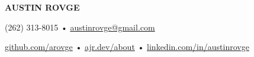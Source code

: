 \centering\textbf{\LARGE AUSTIN ROVGE}

\centering(262) 313-8015 • \href{mailto:austinrovge@gmail.com}{austinrovge@gmail.com}

\centering\href{https://github.com/austinrovge}{github.com/arovge} • \href{https://ajr.dev/about}{ajr.dev/about} • \href{https://linkedin.com/in/austinrovge}{linkedin.com/in/austinrovge}

